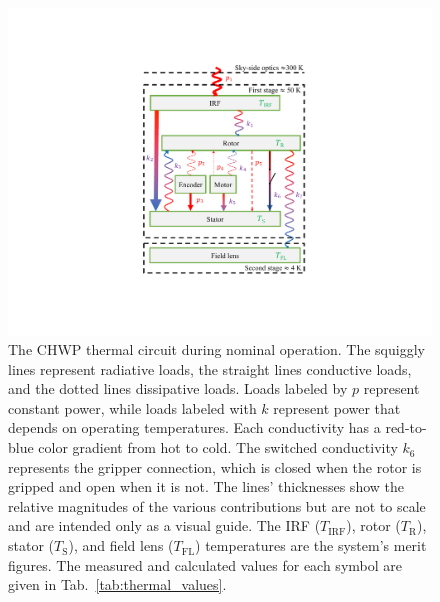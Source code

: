\begin{figure}[!t]
    \centering
    \includegraphics[width=0.7\linewidth, trim=8.5cm 4cm 8cm 3cm, clip]{CHWPDesign/Figures/thermal_diagram.pdf}
    \caption{The CHWP thermal circuit during nominal operation. The squiggly lines represent radiative loads, the straight lines conductive loads, and the dotted lines dissipative loads. Loads labeled by $p$ represent constant power, while loads labeled with $k$ represent power that depends on operating temperatures. Each conductivity has a red-to-blue color gradient from hot to cold. The switched conductivity $k_{6}$ represents the gripper connection, which is closed when the rotor is gripped and open when it is not. The lines' thicknesses show the relative magnitudes of the various contributions but are not to scale and are intended only as a visual guide. The IRF ($T_{\mathrm{IRF}}$), rotor ($T_{\mathrm{R}}$), stator ($T_{\mathrm{S}}$), and field lens ($T_{\mathrm{FL}}$) temperatures are the system's merit figures. The measured and calculated values for each symbol are given in Tab.~\ref{tab:thermal_values}.}
    \label{fig:thermal_diagram}
\end{figure}

